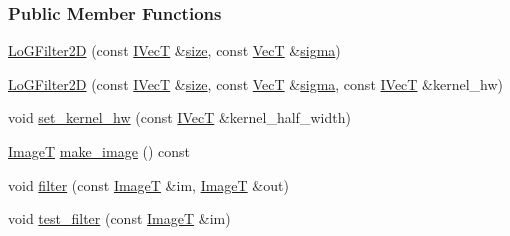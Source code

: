 \subsubsection*{Public Member Functions}
\begin{DoxyCompactItemize}
\item 
\hyperlink{classboxxer_1_1LoGFilter2D_a95dfb4584c05a63875b93724976e124f}{Lo\+G\+Filter2D} (const \hyperlink{classboxxer_1_1GaussFIRFilter_a0083c8c9ab6032dd458b4dc93852c2b8}{I\+VecT} \&\hyperlink{classboxxer_1_1GaussFIRFilter_ac0d4e19bb2be3e8913e77283e7e4317e}{size}, const \hyperlink{classboxxer_1_1LoGFilter2D_ac08d7bc8f4656f625c984a8a15db5e71}{VecT} \&\hyperlink{classboxxer_1_1GaussFIRFilter_a66ced06c688fd544d5f1f8be39aa2125}{sigma})
\item 
\hyperlink{classboxxer_1_1LoGFilter2D_afafdb9015e710e4d3df596e49aff2148}{Lo\+G\+Filter2D} (const \hyperlink{classboxxer_1_1GaussFIRFilter_a0083c8c9ab6032dd458b4dc93852c2b8}{I\+VecT} \&\hyperlink{classboxxer_1_1GaussFIRFilter_ac0d4e19bb2be3e8913e77283e7e4317e}{size}, const \hyperlink{classboxxer_1_1LoGFilter2D_ac08d7bc8f4656f625c984a8a15db5e71}{VecT} \&\hyperlink{classboxxer_1_1GaussFIRFilter_a66ced06c688fd544d5f1f8be39aa2125}{sigma}, const \hyperlink{classboxxer_1_1GaussFIRFilter_a0083c8c9ab6032dd458b4dc93852c2b8}{I\+VecT} \&kernel\+\_\+hw)
\item 
void \hyperlink{classboxxer_1_1LoGFilter2D_a21a9fc0913e13a1922cdda61ebf3cc1d}{set\+\_\+kernel\+\_\+hw} (const \hyperlink{classboxxer_1_1GaussFIRFilter_a0083c8c9ab6032dd458b4dc93852c2b8}{I\+VecT} \&kernel\+\_\+half\+\_\+width)
\item 
\hyperlink{classboxxer_1_1LoGFilter2D_ad05a4ecfd5b16afe3a693bbd71a60425}{ImageT} \hyperlink{classboxxer_1_1LoGFilter2D_ae3344ec82d3934c38893e1ad81dd71f9}{make\+\_\+image} () const 
\item 
void \hyperlink{classboxxer_1_1LoGFilter2D_a467ebae3f97f5f70c9760397b1163a46}{filter} (const \hyperlink{classboxxer_1_1LoGFilter2D_ad05a4ecfd5b16afe3a693bbd71a60425}{ImageT} \&im, \hyperlink{classboxxer_1_1LoGFilter2D_ad05a4ecfd5b16afe3a693bbd71a60425}{ImageT} \&out)
\item 
void \hyperlink{classboxxer_1_1LoGFilter2D_a8cfcad392f0e67302923b21301e88a7c}{test\+\_\+filter} (const \hyperlink{classboxxer_1_1LoGFilter2D_ad05a4ecfd5b16afe3a693bbd71a60425}{ImageT} \&im)
\end{DoxyCompactItemize}

